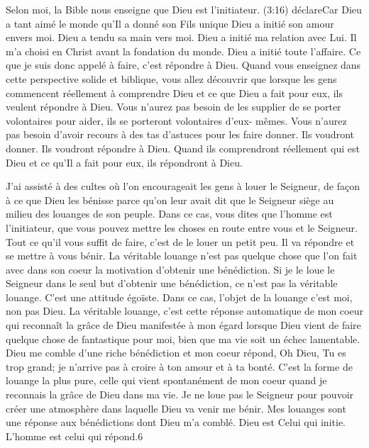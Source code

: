 Selon moi, la Bible nous enseigne que Dieu est l’initiateur. (3:16) déclare\frcolon\og Car Dieu a tant aimé le monde qu’Il a
donné son Fils unique\frcolon\fg{} Dieu a initié son amour envers moi. Dieu a tendu sa main vers moi. Dieu a initié ma relation
avec Lui. Il m’a choisi en Christ avant la fondation du monde. Dieu a initié toute l’affaire. Ce que je suis donc appelé
à faire, c’est répondre à Dieu. Quand vous enseignez dans cette perspective solide et biblique, vous allez découvrir
que lorsque les gens commencent réellement à comprendre Dieu et ce que Dieu a fait pour eux, ils veulent répondre
à Dieu. Vous n’aurez pas besoin de les supplier de se porter volontaires pour aider, ils se porteront volontaires d’eux-
mêmes. Vous n’aurez pas besoin d’avoir recours à des tas d'astuces pour les faire donner. Ils voudront donner. Ils
voudront répondre à Dieu. Quand ils comprendront réellement qui est Dieu et ce qu’Il a fait pour eux, ils répondront à
Dieu.

J’ai assisté à des cultes où l'on encourageait les gens à \og louer le Seigneur\fg{}, de façon à ce que Dieu les bénisse parce
qu’on leur avait dit que le Seigneur siège au milieu des louanges de son peuple. Dans ce cas, vous dites que l’homme
est l’initiateur, que vous pouvez mettre les choses en route entre vous et le Seigneur. Tout ce qu'il vous suffit de faire,
c’est de le louer un petit peu. Il va répondre et se mettre à vous bénir. La véritable louange n’est pas quelque chose
que l’on fait avec dans son coeur la motivation d’obtenir une bénédiction. Si je le loue le Seigneur dans le seul but
d’obtenir une bénédiction, ce n’est pas la véritable louange. C’est une attitude égoïste. Dans ce cas, l’objet de la
louange c’est moi, non pas Dieu. La véritable louange, c’est cette réponse automatique de mon coeur qui reconnaît la
grâce de Dieu manifestée à mon égard lorsque Dieu vient de faire quelque chose de fantastique pour moi, bien que
ma vie soit un échec lamentable. Dieu me comble d'une riche bénédiction et mon coeur répond, \og Oh Dieu, Tu es trop
grand; je n’arrive pas à croire à ton amour et à ta bonté.\fg{} C’est la forme de louange la plus pure, celle qui vient
spontanément de mon coeur quand je reconnais la grâce de Dieu dans ma vie. Je ne loue pas le Seigneur pour
pouvoir créer une atmosphère dans laquelle Dieu va venir me bénir. Mes louanges sont une réponse aux bénédictions
dont Dieu m’a comblé. Dieu est Celui qui initie. L’homme est celui qui répond.6

